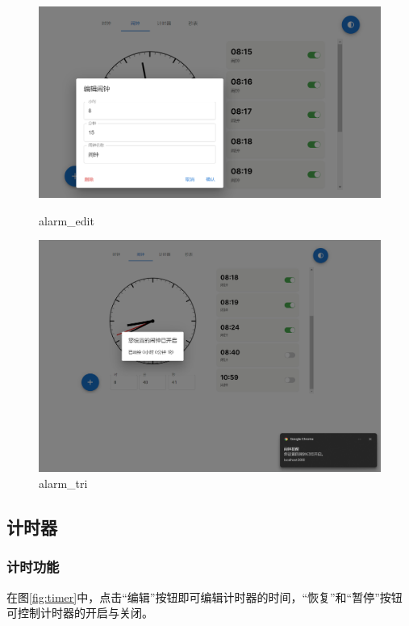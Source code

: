 \documentclass[a4paper,11pt]{article}
\begin{document}
\begin{figure}[!h]
    \centering
    \begin{minipage}{0.48\textwidth}
        \centering
        \includegraphics[width=\linewidth]{image/alarm_edit.png}
        \caption{alarm\_edit}
            \label{fig:alarm_edit}
    \end{minipage}\hfill
    \begin{minipage}{0.48\textwidth}
        \centering
        \includegraphics[width=\linewidth]{image/alarm_trigger.png}
        \caption{alarm\_tri}
        \label{fig:alarm_tri}
    \end{minipage}
\end{figure}


\subsection{计时器}
\subsubsection{计时功能}
在图\ref{fig:timer}中，点击“编辑”按钮即可编辑计时器的时间，“恢复”和“暂停”按钮可控制计时器的开启与关闭。
\end{document}
